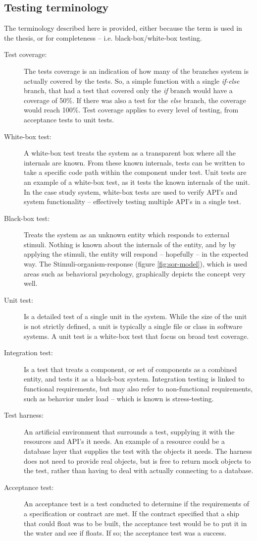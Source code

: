 \subsection{Testing terminology}
The terminology described here is provided, either because the term is used in the thesis, or for completeness -- i.e. black-box/white-box testing.
\begin{description}
  \item[Test coverage:] The tests coverage is an indication of how many of the branches system is actually covered by the tests. So, a simple function with a single \emph{if-else} branch, that had a test that covered only the \emph{if} branch would have a coverage of 50\%. If there was also a test for the \emph{else} branch, the coverage would reach 100\%. Test coverage applies to every level of testing, from acceptance tests to unit tests.
  \item[White-box test:] A white-box test treats the system as a transparent box where all the internals are known. From these known internals, tests can be written to take a specific code path within the component under test. Unit tests are an example of a white-box test, as it tests the known internals of the unit. In the case study system, white-box tests are used to verify API's and system functionality -- effectively testing multiple API's in a single test.
  \item[Black-box test:] Treats the system as an unknown entity which responds to external stimuli. Nothing is known about the internals of the entity, and by by applying the stimuli, the entity will respond -- hopefully -- in the expected way. The Stimuli-organism-response (figure \ref{fig:sor-model}), which is used areas such as behavioral psychology, graphically depicts the concept very well.
  \item[Unit test:] Is a detailed test of a single unit in the system. While the size of the unit is not strictly defined, a unit is typically a single file or class in software systems. A unit test is a white-box test that focus on broad test coverage.
  \item[Integration test:] Is a test that treats a component, or set of components as a combined entity, and tests it as a black-box system. Integration testing is linked to functional requirements, but may also refer to non-functional requirements, such as behavior under load -- which is known is stress-testing.
  \item[Test harness:] An artificial environment that surrounds a test, supplying it with the resources and API's it needs. An example of a resource could be a database layer that supplies the test with the objects it needs. The harness does not need to provide real objects, but is free to return mock objects to the test, rather than having to deal with actually connecting to a database.
  \item[Acceptance test:] An acceptance test is a test conducted to determine if the requirements of a specification or contract are met. If the contract specified that a ship that could float was to be built, the acceptance test would be to put it in the water and see if floats. If so; the acceptance test was a success.
\end{description}
